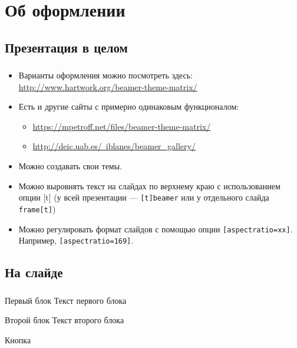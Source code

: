 \documentclass[t, dvipsnames]{beamer}  %
\begin{document}
\section{Об оформлении}
\subsection{Презентация в целом}

\begin{frame}[c] %
	\frametitle{\insertsection}
	\framesubtitle{\insertsubsection}
	\begin{itemize}
			\item Варианты оформления можно посмотреть здесь:  \href{http://www.hartwork.org/beamer-theme-matrix/}{http://www.hartwork.org/beamer-theme-matrix/} 
			\item Есть и другие сайты с примерно одинаковым функционалом:
					\begin{itemize}
					\item \href{https://mpetroff.net/files/beamer-theme-matrix/}{https://mpetroff.net/files/beamer-theme-matrix/}
					\item \href{http://deic.uab.es/~iblanes/beamer_gallery/}{http://deic.uab.es/~iblanes/beamer\_gallery/}
				\end{itemize}
		\item Можно создавать свои темы. 
		\item Можно выровнять текст на слайдах по верхнему краю с использованием опции [t] (у всей презентации ---  \texttt{[t]{beamer}} или у отдельного слайда \texttt{{frame}[t]}) 
		\item Можно регулировать формат слайдов с помощью опции \texttt{[aspectratio=xx]}. Например, \texttt{[aspectratio=169]}. 
	\end{itemize}
\end{frame}

\subsection{На слайде}

\begin{frame}
	\frametitle{\insertsection}
	\framesubtitle{\insertsubsection}
    \begin{block}{Первый блок}
		Текст первого блока
	\end{block}
	\begin{block}{Второй блок}
		Текст второго блока
    \end{block}
	\begin{block}{Кнопка}
		\hyperlink{lab}{} 
	\end{block}
\end{frame}
\end{document}
